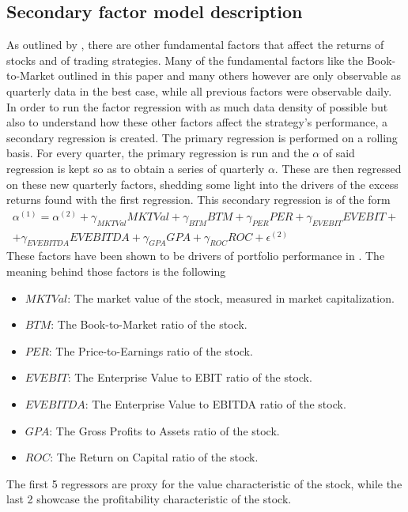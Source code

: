 \subsection{Secondary factor model description}
As outlined by \cite{fama_french_1995}, there are other fundamental factors that affect the returns of stocks and of trading strategies. Many of the fundamental factors like the Book-to-Market outlined in this paper and many others however are only observable as quarterly data in the best case, while all previous factors were observable daily. In order to run the factor regression with as much data density of possible but also to understand how these other factors affect the strategy's performance, a secondary regression is created. The primary regression is performed on a rolling basis. For every quarter, the primary regression is run and the $\alpha$ of said regression is kept so as to obtain a series of quarterly $\alpha$. These are then regressed on these new quarterly factors, shedding some light into the drivers of the excess returns found with the first regression. This secondary regression is of the form
\begin{multline}
    \label{eq:secondary-regression}
    \alpha^{(1)}=\alpha^{(2)} + \gamma_{MKTVal}MKTVal + \gamma_{BTM}BTM + \gamma_{PER}PER + \gamma_{EVEBIT}EVEBIT + \\ + \gamma_{EVEBITDA}EVEBITDA + \gamma_{GPA}GPA + \gamma_{ROC}ROC + \epsilon^{(2)}
\end{multline}
These factors have been shown to be drivers of portfolio performance in \cite{ramon_bermejo_climent_2021}. The meaning behind those factors is the following
\begin{itemize}
    \item $MKTVal$: The market value of the stock, measured in market capitalization.
    \item $BTM$: The Book-to-Market ratio of the stock.
    \item $PER$: The Price-to-Earnings ratio of the stock.
    \item $EVEBIT$: The Enterprise Value to EBIT ratio of the stock. 
    \item $EVEBITDA$: The Enterprise Value to EBITDA ratio of the stock.
    \item $GPA$: The Gross Profits to Assets ratio of the stock.
    \item $ROC$: The Return on Capital ratio of the stock. 
\end{itemize}
The first 5 regressors are proxy for the value characteristic of the stock, while the last 2 showcase the profitability characteristic of the stock. 

